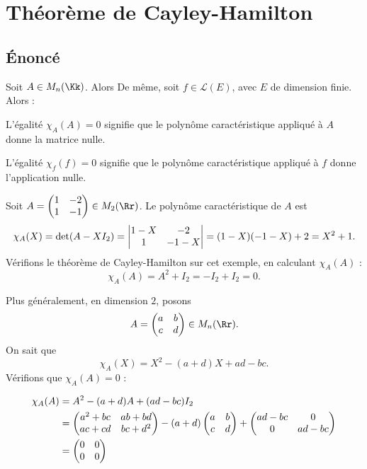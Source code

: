 \documentclass[12pt, class=report,crop=false]{standalone}
\begin{document}
\section{Théorème de Cayley-Hamilton}

\subsection{Énoncé}


\begin{theoreme}
\label{th:cayley-hamilton}
Soit $A \in M_n(\Kk)$. Alors
De même, soit $f \in \mathcal{L}(E)$, avec $E$  de dimension finie. Alors :
\end{theoreme}

L'égalité $\chi_A(A) = 0$ signifie que le polynôme caractéristique appliqué à $A$ donne la matrice nulle.

L'égalité $\chi_f(f) = 0$ signifie que le polynôme caractéristique appliqué à $f$ donne l'application nulle.

\begin{exemple}
Soit $A=\begin{pmatrix}1&-2\cr1&-1\end{pmatrix}\in M_2(\Rr)$.
Le polynôme caractéristique de $A$ est 
$$\chi_A(X)=\det(A-X I_2) = \begin{vmatrix}1-X&-2\cr 1&-1-X\end{vmatrix}=(1-X)(-1-X)+2=X^2+1.$$
Vérifions le théorème de Cayley-Hamilton sur cet exemple, en calculant $\chi_A(A)$ :
$$\chi_A(A) = A^2+I_2 = -I_2 + I_2 = 0.$$ 
\end{exemple}


\begin{exemple}
Plus généralement, en dimension $2$, posons 
$$A=\left(\begin{matrix}a&b\cr c&d\end{matrix}\right)\in M_n(\Rr).$$ 
On sait que  
$$\chi_A(X) = X^2-(a+d)X+ad-bc.$$
Vérifions que $\chi_A(A) = 0$ :

\begin{align*}
\chi_A(A)
  &=A^2-(a+d)A+(ad-bc)I_2 \\
  &=\begin{pmatrix}a^2+bc&ab+bd\cr ac+cd&bc+d^2\end{pmatrix}-
(a+d)\begin{pmatrix}a&b\cr c&d\end{pmatrix}+\begin{pmatrix}ad-bc&0\cr 0&ad-bc\end{pmatrix} \\
  &= \begin{pmatrix}0&0\cr 0&0\end{pmatrix}
\end{align*}
\end{exemple} 
\end{document}
